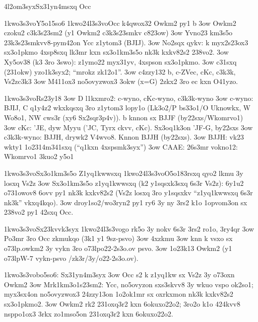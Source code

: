 \24l2om3syx{Sx31yn4msxq Occ}

  \p1kwo3s3vo{Y5o15so6}
  \p1kwo24l3s3vo{Occ k4qwox32 Owkm2 py1 b}
  \s3ow Owkm2 czoku2 c3k3s23sm2 (y1 Owkm2 c3k3s23smkv c823ow)
  \s3ow Yvno23 km3s5o 23k3s23smkvv8-pym42on Ycc z1ytom3 (BJIJ).
  \s3ow No2sqx qykv: k myx2s23ox3 sx3o1pkmo 4xsp8sxq lk3mr kxn
    sx3o1km3s5o nk3k kxkv82s2 238vo2.
  \s3ow Xy5ov38 (k3 3ro 3swo): z1ymo22 myx31yv, 4xspson sx3o1pkmo. 
  \s3ow c31sxq (231okw) yzo1k3syx2; ``mrokz zk12o1''.
  \s3ow c4zzy132 b, c-ZVec, cKc, c3k3k, Vs2zc3k3
  \s3ow M411ox3 no5ovyzwox3 3okw (x=G) 2zkx2 3ro ec kxn O41yzo.

 \p1kwo3s3vo{Rs23y18}
  \s3ow D l1kxmro2: c-wyno, cKc-wyno, c3k3k-wyno
  \s3ow c-wyno: BJIJ, C q1y4z2 wkxkqsxq 3ro z1ytom3 lopy1o (Lk3o2/P
    bs33o1/O Uknowkx, W Wo8o1, NW cws3r (xy6 Sx2sqr3p4v)).
    b knnon sx BJJF (by22sxs/Wkomrvo1)
  \s3ow cKc: 'JE, dyw Myyu ('JC, Tyrx ckvv, cKc).  Sx3oq1k3on 'JF-G, by22sxs
  \s3ow c3k3k-wyno: BJJH, drywk2 V4wvo8. Knnon BJJH (by22sxs). 
  \s3ow BJJH: vk23 wkty1 1o2314m341sxq (``q1kxn 4xspsmk3syx'')
  \s3ow CAAE: 26s3mr vokno12: Wkomrvo1 3kuo2 y5o1

  \p1kwo3s3vo{Sx3o1km3s5o Z1yq1kwwsxq}
  \p1kwo24l3s3vo{O5o183rsxq qyo2 lkmu 3y losxq Vs2z}
  \s3ow Sx3o1km3s5o z1yq1kwwsxq (k2 y1sqsxk3sxq 6s3r Vs2z): 6y1u2
    o731owov8 6ovv py1 nk3k kxkv82s2 (Vs2z losxq 3ro y1sqsxkv
    ``z1yq1kwwsxq 6s3r nk3k'' vkxq4kqo).
  \s3ow droy1so2/wo3ryn2 py1 ry6 3y ny 3rs2 k1o 1opvom3on sx 238vo2
    py1 42sxq Occ.

  \p1kwo3s3vo{Sx23kvvk3syx}
  \p1kwo24l3s3vo{go rk5o 3y nokv 6s3r 3rs2 ro1o, 3ry4qr}
  \s3ow Po3mr 3ro Occ zkmukqo (3k1 y1 9sz-psvo)
  \s3ow 4xzkmu
  \s3ow knn k vsxo sx \3o73lp{.owkm2} 3y vykn 3ro \3o73lp{o22-2s3o.ov} psvo.
  \s3ow 1o23k13 Owkm2 (y1 \3o73lp{W-7 vykn-psvo /zk3r/3y/o22-2s3o.ov}).

  \p1kwo3s3vo{bo5so6: Sx31yn4m3syx}
  \s3ow Occ s2 k z1yq1kw sx Vs2z 3y o73oxn Owkm2
  \s3ow Mrk1km3o1s23sm2: Ycc, no5ovyzon sxs3skvv8 3y wkuo vspo ok2so1;
    myx3sx4on no5ovyzwox3 24zzy13on 1o2ok1mr sx oxrkxmon nk3k kxkv82s2
    sx3o1pkmo2.
  \s3ow Owkm2 rk2 231oxq3r2 kxn 6okuxo22o2; 3ro2o k1o 424kvv8
    nsppo1ox3 3rkx zo1mso5on 231oxq3r2 kxn 6okuxo22o2.

